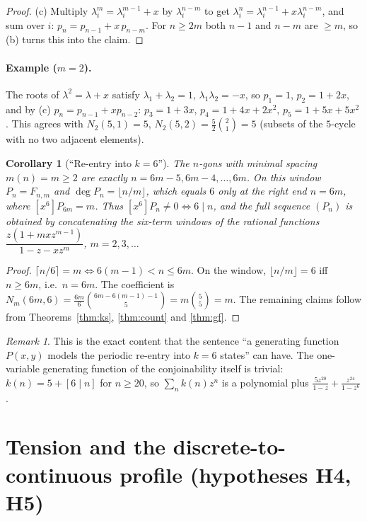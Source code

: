 \documentclass[11pt,a4paper]{article}
\newtheorem{corollary}[theorem]{Corollary}
\theoremstyle{definition}
\theoremstyle{remark}
\newtheorem{remark}[theorem]{Remark}
\begin{document}
\begin{proof}
(c) Multiply $\lambda_i^m=\lambda_i^{m-1}+x$ by $\lambda_i^{n-m}$ to get $\lambda_i^n=\lambda_i^{n-1}+x\lambda_i^{n-m}$, and sum over $i$: $p_n=p_{n-1}+x\,p_{n-m}$. For $n\ge2m$ both $n-1$ and $n-m$ are $\ge m$, so (b) turns this into the claim.
\end{proof}

\paragraph{Example ($m=2$).} The roots of $\lambda^2=\lambda+x$ satisfy $\lambda_1+\lambda_2=1$, $\lambda_1\lambda_2=-x$, so $p_1=1$, $p_2=1+2x$, and by (c) $p_n=p_{n-1}+xp_{n-2}$: $p_3=1+3x$, $p_4=1+4x+2x^2$, $p_5=1+5x+5x^2$.
This agrees with $N_2(5,1)=5$, $N_2(5,2)=\frac52\binom{2}{1}=5$ (subsets of the $5$-cycle with no two adjacent elements).

\begin{corollary}[``Re-entry into $k=6$'']\label{cor:reentry}
The $n$-gons with minimal spacing $m(n)=m\ge2$ are exactly $n=6m-5,6m-4,\dots,6m$. On this window $P_n=F_{n,m}$ and $\deg P_n=\lfloor n/m\rfloor$, which equals $6$ only at the right end $n=6m$, where $[x^6]P_{6m}=m$. Thus $[x^6]P_n\ne0\iff6\mid n$, and the full sequence $(P_n)$ is obtained by concatenating the six-term windows of the rational functions $\dfrac{z(1+mxz^{m-1})}{1-z-xz^m}$, $m=2,3,\dots$
\end{corollary}
\begin{proof}
$\lceil n/6\rceil=m\iff6(m-1)<n\le6m$. On the window, $\lfloor n/m\rfloor=6$ iff $n\ge6m$, i.e.\ $n=6m$. The coefficient is $N_m(6m,6)=\frac{6m}6\binom{6m-6(m-1)-1}{5}=m\binom55=m$. The remaining claims follow from Theorems~\ref{thm:ks}, \ref{thm:count} and \ref{thm:gf}.
\end{proof}

\begin{remark}
This is the exact content that the sentence ``a generating function $P(x,y)$ models the periodic re-entry into $k=6$ states'' can have. The one-variable generating function of the conjoinability itself is trivial: $k(n)=5+[6\mid n]$ for $n\ge20$, so $\sum_nk(n)z^n$ is a polynomial plus $\frac{5z^{20}}{1-z}+\frac{z^{24}}{1-z^6}$.
\end{remark}

\section{Tension and the discrete-to-continuous profile (hypotheses H4, H5)}\label{sec:tension}
\end{document}

